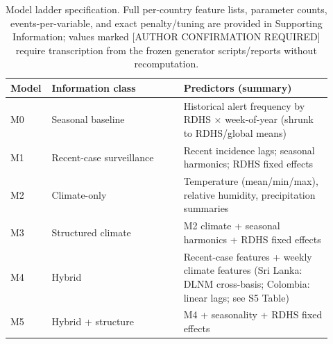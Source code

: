 \documentclass[11pt,a4paper]{article}
\begin{document}
\begin{table}[htbp]
\centering
\caption{Model ladder specification. Full per-country feature lists, parameter counts, events-per-variable, and exact penalty/tuning are provided in Supporting Information; values marked [AUTHOR CONFIRMATION REQUIRED] require transcription from the frozen generator scripts/reports without recomputation.}
\label{tab:modelspec}
\small
\begin{tabular}{p{0.07\linewidth}p{0.40\linewidth}p{0.45\linewidth}}
\toprule
Model & Information class & Predictors (summary) \\
\midrule
M0 & Seasonal baseline & Historical alert frequency by RDHS $\times$ week-of-year (shrunk to RDHS/global means) \\
M1 & Recent-case surveillance & Recent incidence lags; seasonal harmonics; RDHS fixed effects \\
M2 & Climate-only & Temperature (mean/min/max), relative humidity, precipitation summaries \\
M3 & Structured climate & M2 climate + seasonal harmonics + RDHS fixed effects \\
M4 & Hybrid & Recent-case features + weekly climate features (Sri Lanka: DLNM cross-basis; Colombia: linear lags; see S5 Table) \\
M5 & Hybrid + structure & M4 + seasonality + RDHS fixed effects \\
\bottomrule
\end{tabular}
\end{table}

\end{document}
